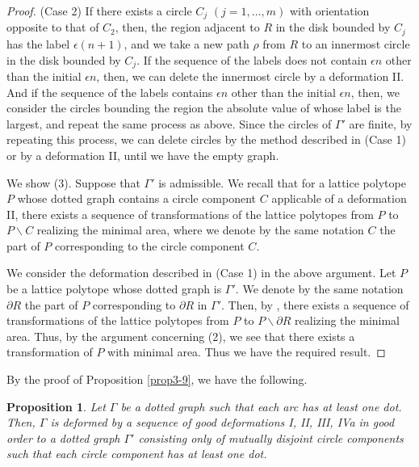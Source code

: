 \documentclass[a4paper,11pt]{amsart}
\numberwithin{equation}{section}
\newtheorem{proposition}[theorem]{Proposition}
\begin{document}
\begin{proof}
 

(Case 2)
If there exists a circle $C_j$ $(j=1, \ldots, m)$ with orientation opposite to that of $C_2$, then, the region adjacent to $R$ in the disk bounded by $C_j$ has the label $\epsilon(n+1)$, and we take a new path $\rho$ from $R$ to an innermost circle in the disk bounded by $C_j$. If the sequence of the labels does not contain $\epsilon n$ other than the initial $\epsilon n$, then, we can delete the innermost circle by a deformation II. And if the sequence of the labels contains $\epsilon n$ other than the initial $\epsilon n$, then, we consider the circles bounding the region the absolute value of whose label is the largest, and repeat the same process as above. 
Since the circles of $\Gamma'$ are finite, 
by repeating this process, we can delete circles by the method described in (Case 1) or by a deformation II, until we have the empty graph. 

We show (3). 
Suppose that $\Gamma'$ is admissible. 
We recall that for a lattice polytope $P$ whose dotted graph contains a circle component $C$ applicable of a deformation II, there exists a sequence of transformations of the lattice polytopes from $P$ to $P\backslash C$ realizing the minimal area, where we denote by the same notation $C$ the part of $P$ corresponding to the circle component $C$. 

We consider the deformation described in (Case 1) in the above argument. 
Let $P$ be a lattice polytope whose dotted graph is $\Gamma'$. We denote by the same notation $\partial R$ the part of $P$ corresponding to $\partial R$ in $\Gamma'$. 
Then, by \cite[Theorem 5.9]{N}, there exists a sequence of transformations of the lattice polytopes from $P$ to $P\backslash \partial R$ realizing the minimal area. 
Thus, by the argument concerning (2), we see that there exists a transformation of $P$ with minimal area. 
Thus we have the required result. 
\end{proof}

By the proof of Proposition \ref{prop3-9}, we have the following. 
\begin{proposition}
Let $\Gamma$ be a dotted graph such that each arc has at least one dot. Then, $\Gamma$ is deformed by a sequence of good deformations I, II, III, IVa in good order to a dotted graph $\Gamma'$ consisting only of mutually disjoint circle components such that each circle component has at least one dot.  
\end{proposition}
\end{document}
